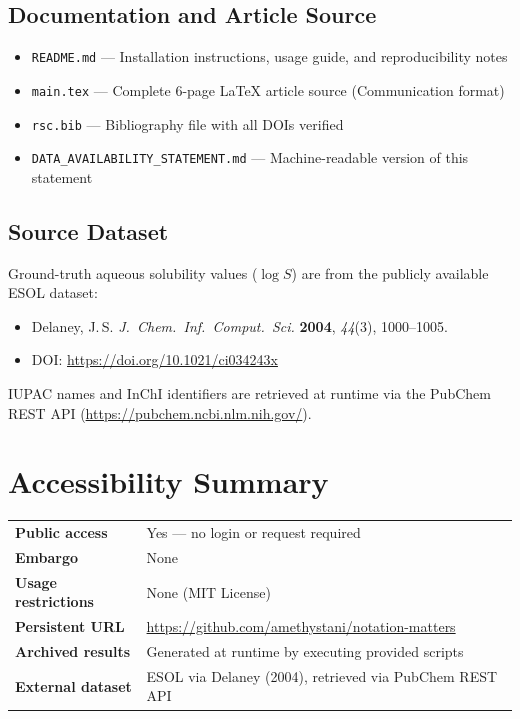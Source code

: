 \documentclass[12pt,a4paper]{article}
\begin{document}
\subsection*{Documentation and Article Source}

\begin{itemize}
  \item \texttt{README.md} --- Installation instructions, usage guide, and reproducibility notes
  \item \texttt{main.tex} --- Complete 6-page LaTeX article source (Communication format)
  \item \texttt{rsc.bib} --- Bibliography file with all DOIs verified
  \item \texttt{DATA\_AVAILABILITY\_STATEMENT.md} --- Machine-readable version of this statement
\end{itemize}

\subsection*{Source Dataset}

Ground-truth aqueous solubility values ($\log S$) are from the publicly available ESOL dataset:

\begin{itemize}
  \item Delaney, J.\,S. \textit{J.\ Chem.\ Inf.\ Comput.\ Sci.} \textbf{2004}, \textit{44}(3), 1000--1005.
  \item DOI: \url{https://doi.org/10.1021/ci034243x}
\end{itemize}

IUPAC names and InChI identifiers are retrieved at runtime via the PubChem REST API (\url{https://pubchem.ncbi.nlm.nih.gov/}).

\section*{Accessibility Summary}

\vspace{0.5em}
\begin{tabular}{>{\bfseries}lp{10cm}}
  \toprule
  Public access & Yes --- no login or request required \\
  Embargo & None \\
  Usage restrictions & None (MIT License) \\
  Persistent URL & \url{https://github.com/amethystani/notation-matters} \\
  Archived results & Generated at runtime by executing provided scripts \\
  External dataset & ESOL via Delaney (2004), retrieved via PubChem REST API \\
  \bottomrule
\end{tabular}
\vspace{0.5em}
\end{document}
